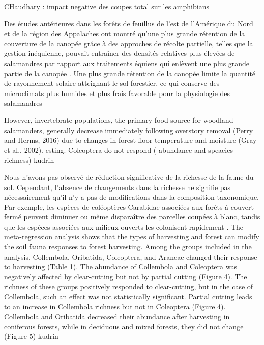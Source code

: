 CHaudhary : impact negative des coupes total sur les amphibians

Des études antérieures dans les forêts de feuillus de l'est de l'Amérique du Nord et de la région des Appalaches ont montré qu'une plus grande rétention de la couverture de la canopée grâce à des approches de 
récolte partielle, telles que la gestion inéquienne, pouvait entraîner des densités relatives plus élevées de salamandres par rapport aux traitements équiens qui enlèvent une plus grande partie de la canopée \citep{Hocking2013Effectsexperimental,Harper2015Impactforestry,Mahoney2016Woodlandsalamander}. 
Une plus grande rétention de la canopée limite la quantité de rayonnement solaire atteignant le sol forestier, ce qui conserve des microclimats plus humides et plus frais favorable pour la physiologie des salamandres \citep{Homyack2011Energeticssurfaceactive}


However, invertebrate populations, the primary food source for woodland salamanders, generally decrease immediately following overstory removal (Perry and Herms, 2016) due to changes in forest floor temperature and moisture (Gray et al., 2002).
esting. Coleoptera do not respond ( abundance and speacies richness) kudrin

Nous n'avons pas observé de réduction significative de la richesse de la faune du sol. 
Cependant, l'absence de changements dans la richesse ne signifie pas nécessairement qu'il n'y a pas de modifications dans la composition taxonomique. 
Par exemple, les espèces de coléoptères Carabidae associées aux forêts à couvert fermé peuvent diminuer ou même disparaître des parcelles coupées à blanc, 
tandis que les espèces associées aux milieux ouverts les colonisent rapidement \citep{Kudrin2023metaanalysiseffects}.
The meta-regression analysis shows that the types of harvesting and forest can modify the soil fauna responses to forest harvesting. Among the groups included in the analysis, Collembola, Oribatida, Coleoptera, and Araneae changed their response to harvesting (Table 1). The abundance of Collembola and Coleoptera was negatively affected by clear-cutting but not by partial cutting (Figure 4). The richness of these groups positively responded to clear-cutting, but in the case of Collembola, such an effect was not statistically significant. Partial cutting leads to an increase in Collembola richness but not in Coleoptera (Figure 4). Collembola and Oribatida decreased their abundance after harvesting in coniferous forests, while in deciduous and mixed forests, they did not change (Figure 5) kudrin

